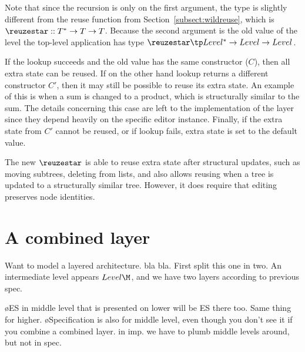 Note that since the recursion is only on the first argument, the type is slightly different from the reuse function from Section~\ref{subsect:wildreuse}, which is $\reuzestar ::  T^* \to T \to T$. Because the second argument is the old value of the level the top-level application has type $\reuzestar \tp Level^* \to Level \to Level$.

If the lookup succeeds and the old value has the same constructor ($C$), then all extra state can be reused. If on the other hand lookup returns a different constructor $C'$, then it may still be possible to reuse its extra state. An example of this is when a sum is changed to a product, which is structurally similar to the sum. The details concerning this case are left to the implementation of the layer since they depend heavily on the specific editor instance. Finally, if the extra state from $C'$ cannot be reused, or if lookup fails, extra state is set to the default value.

The new $\reuzestar$ is able to reuse extra state after structural updates, such as moving subtrees, deleting from lists, and also allows reusing when a tree is updated to a structurally similar tree. However, it does require that editing preserves node identities. 




%
%






%																
%																
%																
\section{A combined layer}  \label{sect:combinedExtra}

\toHere

Want to model a layered architecture. bla bla. First split this one in two. An intermediate level appears $Level\M$, and we have two layers according to previous spec. 

\bl
\o ES in middle level that is presented on lower will be ES there too. Same thing for higher.
\o Specification is also for middle level, even though you don't see it if you combine a  combined layer. in imp. we have to plumb middle levels around, but not in spec.
\el

